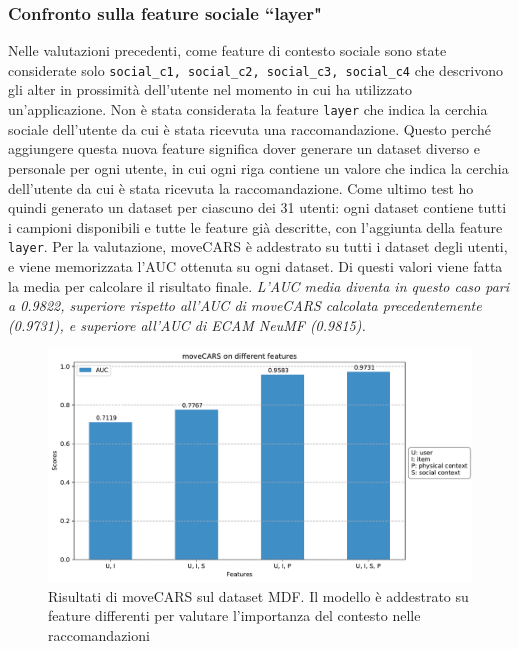 \documentclass[12pt,italian]{report}
\begin{document}
\subsubsection{Confronto sulla feature sociale ``layer"}
Nelle valutazioni precedenti, come feature di contesto sociale sono state considerate solo \texttt{social\_c1, social\_c2, social\_c3, social\_c4} che descrivono gli alter in prossimità dell'utente nel momento in cui ha utilizzato un'applicazione. Non è stata considerata la feature \texttt{layer} che indica la cerchia sociale dell'utente da cui è stata ricevuta una raccomandazione. Questo perché aggiungere questa nuova feature significa dover generare un dataset diverso e personale per ogni utente, in cui ogni riga contiene un valore che indica la cerchia dell'utente da cui è stata ricevuta la raccomandazione. Come ultimo test ho quindi generato un dataset per ciascuno dei 31 utenti: ogni dataset contiene tutti i campioni disponibili e tutte le feature già descritte, con l'aggiunta della feature \texttt{layer}. Per la valutazione, moveCARS è addestrato su tutti i dataset degli utenti, e viene memorizzata l'AUC ottenuta su ogni dataset. Di questi valori viene fatta la media per calcolare il risultato finale. \textit{L'AUC media diventa in questo caso pari a 0.9822, superiore rispetto all'AUC di moveCARS calcolata precedentemente (0.9731), e superiore all'AUC di ECAM NeuMF (0.9815).}

\begin{figure}
  \centering
  \includegraphics[width=\linewidth]{immagini/moveCARS_diff_features.pdf}
  \caption{Risultati di moveCARS sul dataset MDF. Il modello è addestrato su feature differenti per valutare l'importanza del contesto nelle raccomandazioni}
  \label{fig:result-movecars-mdf}
\end{figure}
\end{document}
